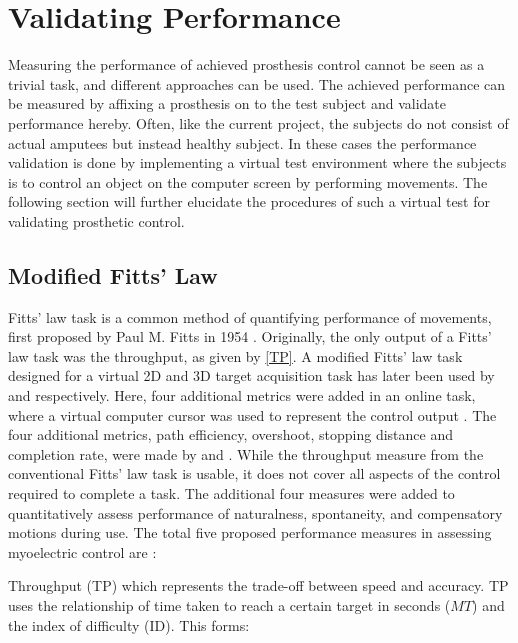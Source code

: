 
\section{Validating Performance} \label{sec:fitts}

Measuring the performance of achieved prosthesis control cannot be seen as a trivial task, and different approaches can be used. The achieved performance can be measured by affixing a prosthesis on to the test subject and validate performance hereby. Often, like the current project, the subjects do not consist of actual amputees but instead healthy subject. In these cases the performance validation is done by implementing a virtual test environment where the subjects is to control an object on the computer screen by performing movements. The following section will further elucidate the procedures of such a virtual test for validating prosthetic control.      


\subsection{Modified Fitts' Law}

Fitts' law task is a common method of quantifying performance of movements, first proposed by Paul M. Fitts in 1954 \cite{Fitts1954}. Originally, the only output of a Fitts' law task was the throughput, as given by \eqref{TP}. A modified Fitts' law task designed for a virtual 2D and 3D target acquisition task has later been used by \cite{Kamavuako2014} and \cite{Scheme2013} respectively. Here, four additional metrics were added in an online task, where a virtual computer cursor was used to represent the control output \cite{Scheme2013, Kamavuako2014}. The four additional metrics, path efficiency, overshoot, stopping distance and completion rate, were made by \cite{Poulton2013} and \cite{ Simon2011}. While the throughput measure from the conventional Fitts' law task is usable, it does not cover all aspects of the control required to complete a task. The additional four measures were added to quantitatively assess performance of naturalness, spontaneity, and compensatory motions during use. The total five proposed performance measures in assessing myoelectric control are \cite{Scheme2013a}: 

Throughput (TP) which represents the trade-off between speed and accuracy. TP uses the relationship of time taken to reach a certain target in seconds ($MT$) and the index of difficulty (ID). This forms: \cite{Scheme2013,Fitts1954}

